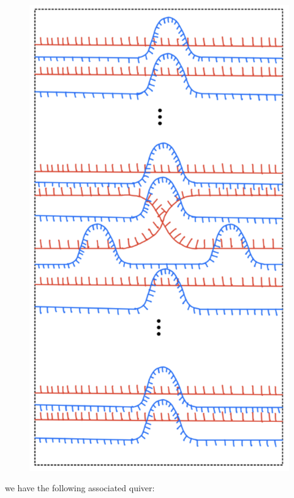 \begin{figure}[H] 
    \centering
    \includegraphics[scale = 0.95]{diagrams/local_systems_on_as_diagrams/1.png} 
    \caption{}
    \label{fig:your-label}
\end{figure}

we have the following associated quiver:


